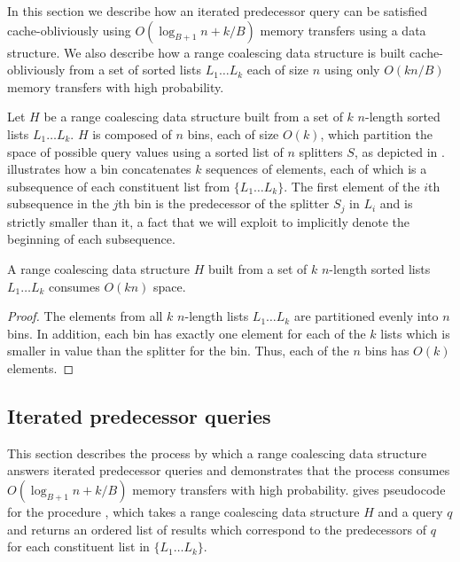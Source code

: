 
In this section we describe how an iterated predecessor query can be 
satisfied cache-obliviously using $O(\log_{B+1} n + k/B)$ 
memory transfers using a  data structure.  
We also describe how a range coalescing data structure is built 
cache-obliviously from a set of sorted lists $L_1 \ldots L_k$ each of size $n$ 
using only $O(kn/B)$ memory transfers with high probability.  


Let $H$ be a range coalescing data structure built from a set of $k$ $n$-length
sorted lists $L_1 \ldots L_k$.  $H$ is composed of $n$ bins, each of size $O(k)$,
which partition the space of possible query values using a sorted list of $n$ 
splitters $S$, as depicted in .  
illustrates how a bin concatenates $k$ sequences of elements, each of which is a 
subsequence of each constituent list from $\{L_1 \ldots L_k\}$.  
The first element of the $i$th subsequence in the $j$th bin is the predecessor
of the splitter $S_j$ in $L_i$ and is strictly smaller than it, a fact that we will 
exploit to implicitly denote the beginning of each subsequence.  

\begin{lemma}
A range coalescing data structure $H$ built from a set of $k$ $n$-length
sorted lists $L_1 \ldots L_k$ consumes $O(kn)$ space.
\end{lemma}
\begin{proof}
The elements from all $k$ $n$-length lists $L_1 \ldots L_k$ are partitioned 
evenly into $n$ bins.  In addition, each bin has exactly one element for each of 
the $k$ lists which is smaller in value than the splitter for the bin.  Thus, each
of the $n$ bins has $O(k)$ elements.
\end{proof}


\subsection*{Iterated predecessor queries}

This section describes the process by which a range coalescing data structure
answers iterated predecessor queries and demonstrates that the process consumes
$O(\log_{B+1} n + k/B)$ memory transfers with high probability.  
gives pseudocode for the procedure , which takes a range
coalescing data structure $H$ and a query $q$ and returns an ordered list of results which
correspond to the predecessors of $q$ for each constituent list in $\{ L_1 \ldots L_k \}$.

